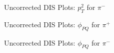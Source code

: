 \begin{frame}{Uncorrected DIS Plots: $p_T^2$ for $\pi^-$}
    \label{20.15f::pt2_pi-}

    \begin{figure}[t]
    \end{figure}

\end{frame}

\begin{frame}{Uncorrected DIS Plots: $\phi_{PQ}$ for $\pi^+$}
    \label{20.15g::phipq_pi+}

    \begin{figure}[t]
    \end{figure}

\end{frame}

\begin{frame}{Uncorrected DIS Plots: $\phi_{PQ}$ for $\pi^-$}
    \label{20.15h::phipq_pi-}

    \begin{figure}[t]
    \end{figure}

\end{frame}
